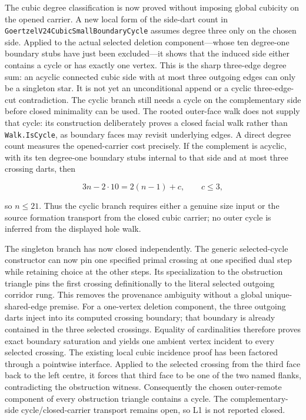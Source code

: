 \documentclass[11pt]{article}
\theoremstyle{definition}
\begin{document}
The cubic degree classification is now proved without imposing global
cubicity on the opened carrier.  A new local form of the side-dart count in
\texttt{GoertzelV24CubicSmallBoundaryCycle} assumes degree three only on the
chosen side.  Applied to the actual selected deletion component---whose ten
degree-one boundary stubs have just been excluded---it shows that the induced
side either contains a cycle or has exactly one vertex.  This is the sharp
three-edge degree sum: an acyclic connected cubic side with at most three
outgoing edges can only be a singleton star.  It is not yet an unconditional
append or a cyclic three-edge-cut contradiction.  The cyclic branch still
needs a cycle on the complementary side before closed minimality can be used.
The rooted outer-face walk does not supply that cycle: its construction
deliberately proves a closed facial walk rather than \texttt{Walk.IsCycle}, as
boundary faces may revisit underlying edges.  A direct degree count measures
the opened-carrier cost precisely.  If the complement is acyclic, with its ten
degree-one boundary stubs internal to that side and at most three crossing
darts, then

\[
  3n-2\cdot 10 = 2(n-1)+c,\qquad c\leq 3,
\]

so \(n\leq21\).  Thus the cyclic branch requires either a genuine size input
or the source formation transport from the closed cubic carrier; no outer
cycle is inferred from the displayed hole walk.

The singleton branch has now closed independently.  The generic
selected-cycle constructor can now pin one specified primal crossing at one
specified dual step while retaining choice at the other steps.  Its
specialization to the obstruction triangle pins the first crossing
definitionally to the literal selected outgoing corridor rung.  This removes
the provenance ambiguity without a global unique-shared-edge premise.
For a one-vertex deletion component, the three outgoing darts inject into its
computed crossing boundary; that boundary is already contained in the three
selected crossings.  Equality of cardinalities therefore proves exact
boundary saturation and yields one ambient vertex incident to every selected
crossing.  The existing local cubic incidence proof has been factored through
a pointwise interface.  Applied to the selected crossing from the third face
back to the left centre, it forces that third face to be one of the two named
flanks, contradicting the obstruction witness.  Consequently the chosen
outer-remote component of every obstruction triangle contains a cycle.  The
complementary-side cycle/closed-carrier transport remains open, so L1 is not
reported closed.
\end{document}
